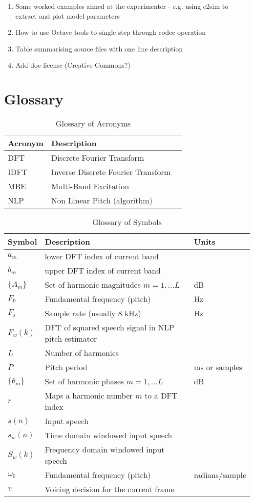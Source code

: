 \documentclass{article}
\begin{document}
\begin{enumerate}
\item Some worked examples aimed at the experimenter - e.g. using c2sim to extract and plot model parameters
\item How to use Octave tools to single step through codec operation
\item Table summarising source files with one line description
\item Add doc license (Creative Commons?)
\end{enumerate}

\section{Glossary}

\label{sect:glossary}
\begin{table}[H]
\label{tab:acronyms}
\centering
\begin{tabular}{l l l }
\hline
Acronym & Description \\
\hline
DFT & Discrete Fourier Transform \\
IDFT & Inverse Discrete Fourier Transform \\
MBE & Multi-Band Excitation \\
NLP & Non Linear Pitch (algorithm) \\
\hline
\end{tabular}
\caption{Glossary of Acronyms}
\end{table}

\begin{table}[H]
\label{tab:symbol_glossary}
\centering
\begin{tabular}{l l l }
\hline
Symbol & Description & Units \\
\hline
$a_m$ & lower DFT index of current band \\
$b_m$ & upper DFT index of current band \\
$\{A_m\}$ & Set of harmonic magnitudes $m=1,...L$ & dB \\
$F_0$ & Fundamental frequency (pitch) & Hz \\
$F_s$ & Sample rate (usually 8 kHz) & Hz \\
$F_w(k)$ & DFT of squared speech signal in NLP pitch estimator \\
$L$ & Number of harmonics \\
$P$ & Pitch period & ms or samples \\
$\{\theta_m\}$ & Set of harmonic phases $m=1,...L$ & dB \\
$r$ & Maps a harmonic number $m$ to a DFT index \\
$s(n)$ & Input speech \\
$s_w(n)$ & Time domain windowed input speech \\
$S_w(k)$ & Frequency domain windowed input speech \\
$\omega_0$ & Fundamental frequency (pitch) & radians/sample \\
$v$ & Voicing decision for the current frame \\
\hline
\end{tabular}
\caption{Glossary of Symbols}
\end{table}



\end{document}
